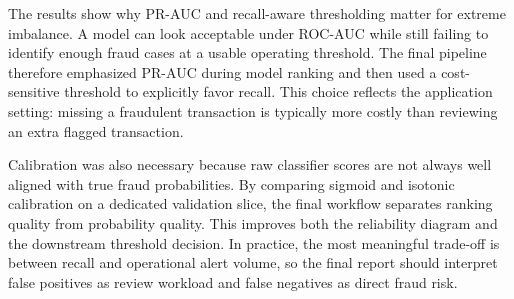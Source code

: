 The results show why PR-AUC and recall-aware thresholding matter for extreme imbalance. A model can look acceptable under ROC-AUC while still failing to identify enough fraud cases at a usable operating threshold. The final pipeline therefore emphasized PR-AUC during model ranking and then used a cost-sensitive threshold to explicitly favor recall. This choice reflects the application setting: missing a fraudulent transaction is typically more costly than reviewing an extra flagged transaction.

Calibration was also necessary because raw classifier scores are not always well aligned with true fraud probabilities. By comparing sigmoid and isotonic calibration on a dedicated validation slice, the final workflow separates ranking quality from probability quality. This improves both the reliability diagram and the downstream threshold decision. In practice, the most meaningful trade-off is between recall and operational alert volume, so the final report should interpret false positives as review workload and false negatives as direct fraud risk.
